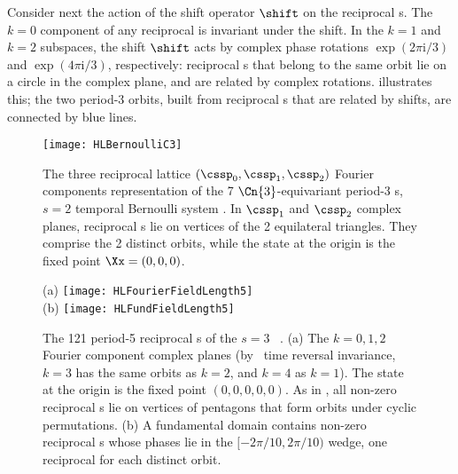 Consider next the action of the shift operator $\shift$ on the reciprocal
{\lattstate}s. The $k=0$ component of any reciprocal {\lattstate} is
invariant under the shift. In the $k=1$ and $k=2$ subspaces, the shift
$\shift$ acts by complex phase rotations $\exp(2 \pi \mathrm{i}/3)$ and
$\exp(4 \pi \mathrm{i}/3)$, respectively: reciprocal {\lattstate}s that
belong to the same orbit lie on a circle in the complex plane, and are
related by complex rotations.  illustrates
this; the two period-3 orbits, built from reciprocal {\lattstate}s that
are related by shifts, are connected by blue lines.


\begin{figure}
  \centering
\texttt{[image: HLBernoulliC3]}
  \caption{\label{fig:BernC3}
The three reciprocal lattice $(\cssp_{0},\cssp_{1},\cssp_{2})$ Fourier
components representation of the 7 $\Cn{3}$-equivariant period-3
{\lattstate}s, $s=2$ {temporal Bernoulli system} . In
$\cssp_1$ and $\cssp_2$ complex planes, reciprocal {\lattstate}s lie on
vertices of the 2 equilateral triangles. They comprise the 2 distinct
 orbits, while the state at the origin is the fixed point
$\Xx=(0,0,0)$.
}
\end{figure}

\begin{figure}
  \centering
{(a)} %
\texttt{[image: HLFourierFieldLength5]}
~~~
\\
{(b)} %
\texttt{[image: HLFundFieldLength5]}
\\ %
  \caption{\label{fig:templattC5} %
The 121 period-5 reciprocal {\lattstate}s
of the $s=3$ \templatt\ .
    (a)
The $k=0,1,2$ Fourier component complex planes (by \templatt\ time
reversal invariance, $k=3$ has the same orbits as $k=2$, and  $k=4$ as
$k=1$).
The state at the origin is the fixed point $(0,0,0,0,0)$.
As in , all non-zero reciprocal {\lattstate}s
lie on vertices of pentagons that form orbits under  cyclic permutations.
    (b)
A  fundamental domain contains non-zero  reciprocal
{\lattstate}s whose phases lie in the $[-2\pi/10,2\pi/10)$ wedge, one reciprocal
{\lattstate} for each distinct  orbit.
          }
\end{figure}


